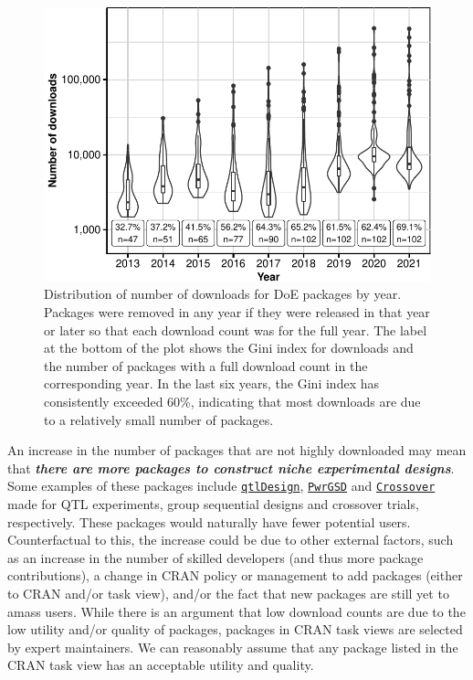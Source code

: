 \documentclass{article}
\begin{document}
\begin{figure}[htbp]

{\centering \includegraphics{figures/download-share-1} 

}

\caption{Distribution of number of downloads for DoE packages by year. Packages were removed in any year if they were released in that year or later so that each download count was for the full year. The label at the bottom of the plot shows the Gini index for downloads and the number of packages with a full download count in the corresponding year. In the last six years, the Gini index has consistently exceeded 60\%, indicating that most downloads are due to a relatively small number of packages. }\label{fig:download-share}
\end{figure}

An increase in the number of packages that are not highly downloaded may
mean that \textbf{\emph{there are more packages to construct niche
experimental designs}}. Some examples of these packages include
\href{https://cran.r-project.org/web/packages/qtlDesign/index.html}{\texttt{qtlDesign}},
\href{https://cran.r-project.org/web/packages/PwrGSD/index.html}{\texttt{PwrGSD}}
and
\href{https://cran.r-project.org/web/packages/Crossover/index.html}{\texttt{Crossover}}
made for QTL experiments, group sequential designs and crossover trials,
respectively. These packages would naturally have fewer potential users.
Counterfactual to this, the increase could be due to other external
factors, such as an increase in the number of skilled developers (and
thus more package contributions), a change in CRAN policy or management
to add packages (either to CRAN and/or task view), and/or the fact that
new packages are still yet to amass users. While there is an argument
that low download counts are due to the low utility and/or quality of
packages, packages in CRAN task views are selected by expert
maintainers. We can reasonably assume that any package listed in the
CRAN task view has an acceptable utility and quality.
\end{document}
